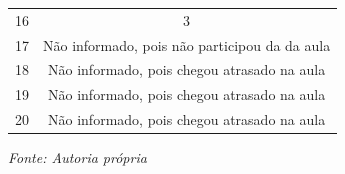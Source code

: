 \begin{enumerate}[label=\emph{\arabic*})]
\begin{enumerate}[label=\emph{\alph*})]
\begin{table}[]
{\begin{tabular}{cc}
					            16                             & 3                                             \\
					            17                             & Não informado, pois não participou da da aula \\
					            18                             & Não informado, pois chegou atrasado na aula   \\
					            19                             & Não informado, pois chegou atrasado na aula   \\
					            20                             & Não informado, pois chegou atrasado na aula   \\
					            \hline
				            \end{tabular}
			            }
			            \label{tab:d-1}
			            \begin{minipage}{0.7\linewidth}
				            \emph{Fonte: Autoria própria}
			            \end{minipage}
		            \end{table}


\end{enumerate}
\end{enumerate}
